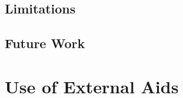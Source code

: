\documentclass[a4paper,11pt]{article}
\theoremstyle{definition}
\begin{document}
\subsection{Limitations}

\subsection{Future Work}


\section*{Use of External Aids}




\end{document}
